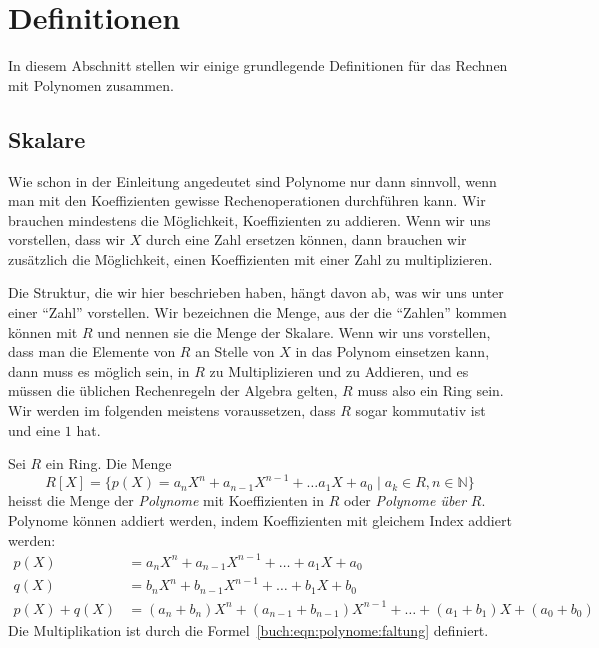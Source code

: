 %
%
%
\section{Definitionen
\label{buch:section:polynome:definitionen}}
In diesem Abschnitt stellen wir einige grundlegende Definitionen für das
Rechnen mit Polynomen zusammen.

%
%
\subsection{Skalare
\label{buch:subsection:polynome:skalare}}
Wie schon in der Einleitung angedeutet sind Polynome nur dann sinnvoll,
wenn man mit den Koeffizienten gewisse Rechenoperationen durchführen kann.
Wir brauchen mindestens die Möglichkeit, Koeffizienten zu addieren.
Wenn wir uns vorstellen, dass wir $X$ durch eine Zahl ersetzen können,
dann brauchen wir zusätzlich die Möglichkeit, einen Koeffizienten mit einer
Zahl zu multiplizieren.

Die Struktur, die wir hier beschrieben haben, hängt davon ab, was wir uns
unter einer ``Zahl'' vorstellen.
Wir bezeichnen die Menge, aus der die ``Zahlen'' kommen können mit $R$ und
nennen sie die Menge der Skalare.
%
Wenn wir uns vorstellen, dass man die Elemente von $R$ an Stelle von $X$
in das Polynom einsetzen kann, dann muss es möglich sein, in $R$ zu
Multiplizieren und zu Addieren, und es müssen die üblichen Rechenregeln
der Algebra gelten, $R$ muss also ein Ring sein.
%
Wir werden im folgenden meistens voraussetzen, dass $R$ sogar kommutativ
ist und eine $1$ hat.

\begin{definition}
Sei $R$ ein Ring.
Die Menge
\[
R[X]
=
\{
p(X) = a_nX^n+a_{n-1}X^{n-1} + \dots a_1X+a_0\;|\; a_k\in R, n\in\mathbb{N}
\}
\]
heisst die Menge der {\em Polynome} mit Koeffizienten in $R$
oder
{\em Polynome über} $R$.
%
Polynome können addiert werden, indem Koeffizienten mit gleichem Index
addiert werden:
\begin{align*}
p(X) &= a_nX^n + a_{n-1}X^{n-1} + \dots + a_1X + a_0\\
q(X) &= b_nX^n + b_{n-1}X^{n-1} + \dots + b_1X + b_0\\
p(X)+q(X)
&=
(a_n+b_n)X^n
+
(a_{n-1}+b_{n-1})X^{n-1}
+
\dots
+
(a_1+b_1)X
+
(a_0+b_0)
\end{align*}
Die Multiplikation ist durch die Formel~\eqref{buch:eqn:polynome:faltung}
definiert.
\end{definition}

